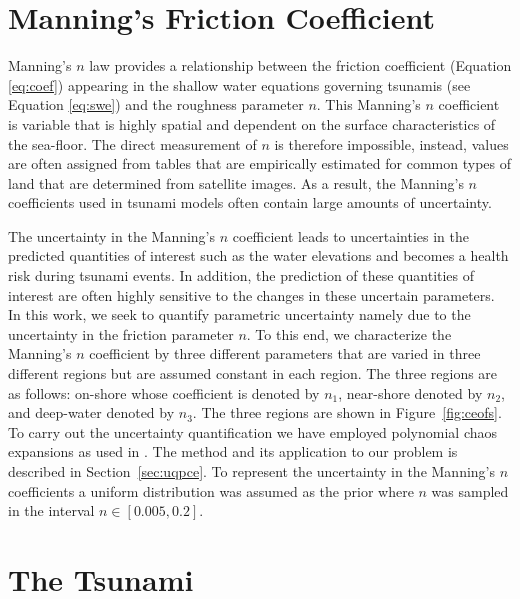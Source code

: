 \section{Manning's Friction Coefficient}
\label{sec:manning}

Manning's $n$ law provides a relationship between the friction coefficient 
(Equation \ref{eq:coef}) appearing in the shallow
water equations governing tsunamis (see Equation \ref{eq:swe})
and the roughness parameter $n$. 
This Manning's $n$ coefficient is variable that is highly spatial 
and dependent on the surface characteristics of the sea-floor. 
The direct measurement of $n$ is therefore impossible, instead, values
are often assigned from tables that are empirically estimated
for common types of land that are determined from satellite images.
As a result, the Manning's $n$ coefficients used in tsunami models
often contain large amounts of uncertainty.

The uncertainty in the Manning's $n$ coefficient leads to uncertainties
in the predicted quantities of interest such as the water elevations
and becomes a health risk during tsunami events. In addition, 
the prediction of these quantities of interest are often highly sensitive to 
the changes in these uncertain parameters. 
In this work, we seek to quantify parametric uncertainty namely due 
to the uncertainty in the friction parameter $n$. To this end,
we characterize the Manning's $n$ coefficient by three different parameters
that are varied in three different regions but are assumed
constant in each region. The three regions are as follows: 
on-shore whose coefficient is denoted by $n_1$, near-shore 
denoted by $n_2$, and deep-water denoted by $n_3$.
The three regions are shown in Figure~\ref{fig:ceofs}.
To carry out the uncertainty quantification we have employed polynomial chaos expansions 
as used in \cite{sraj:2013a,sraj:2013b}. The method and its application
to our problem is described in Section~\ref{sec:uqpce}.  
To represent the uncertainty in the Manning's $n$ coefficients a uniform 
distribution was assumed as the prior where $n$ was sampled in the interval $n \in [0.005,0.2]$.  

\section{The \tohoku Tsunami} 
\label{sec:tohoku}

